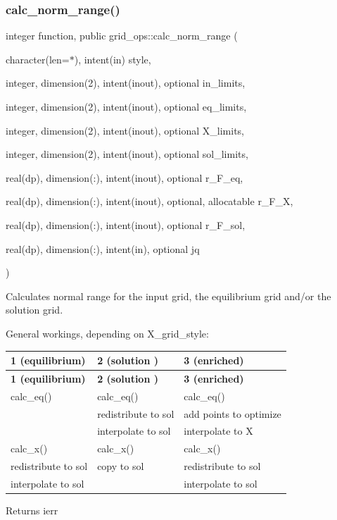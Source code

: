 \subsubsection{\texorpdfstring{calc\+\_\+norm\+\_\+range()}{calc\_norm\_range()}}
{\footnotesize\ttfamily integer function, public grid\+\_\+ops\+::calc\+\_\+norm\+\_\+range (\begin{DoxyParamCaption}\item[{character(len=$\ast$), intent(in)}]{style,  }\item[{integer, dimension(2), intent(inout), optional}]{in\+\_\+limits,  }\item[{integer, dimension(2), intent(inout), optional}]{eq\+\_\+limits,  }\item[{integer, dimension(2), intent(inout), optional}]{X\+\_\+limits,  }\item[{integer, dimension(2), intent(inout), optional}]{sol\+\_\+limits,  }\item[{real(dp), dimension(\+:), intent(inout), optional}]{r\+\_\+\+F\+\_\+eq,  }\item[{real(dp), dimension(\+:), intent(inout), optional, allocatable}]{r\+\_\+\+F\+\_\+X,  }\item[{real(dp), dimension(\+:), intent(inout), optional}]{r\+\_\+\+F\+\_\+sol,  }\item[{real(dp), dimension(\+:), intent(in), optional}]{jq }\end{DoxyParamCaption})}



Calculates normal range for the input grid, the equilibrium grid and/or the solution grid. 

General workings, depending on {\ttfamily X\+\_\+grid\+\_\+style\+:} 

\tabulinesep=1mm
\begin{longtabu} spread 0pt [c]{*{3}{|X[-1]}|}
\hline
\rowcolor{\tableheadbgcolor}\textbf{ 1 (equilibrium) }&\textbf{ 2 (solution ) }&\textbf{ 3 (enriched)  }\\
\endfirsthead
\hline
\endfoot
\hline
\rowcolor{\tableheadbgcolor}\textbf{ 1 (equilibrium) }&\textbf{ 2 (solution ) }&\textbf{ 3 (enriched)  }\\
\endhead
calc\+\_\+eq() &calc\+\_\+eq() &calc\+\_\+eq() \\
&redistribute to sol &add points to optimize \\
&interpolate to sol &interpolate to X \\
calc\+\_\+x() &calc\+\_\+x() &calc\+\_\+x() \\
redistribute to sol &copy to sol &redistribute to sol \\
interpolate to sol &&interpolate to sol \\
\end{longtabu}
\begin{DoxyReturn}{Returns}
ierr
\end{DoxyReturn}

